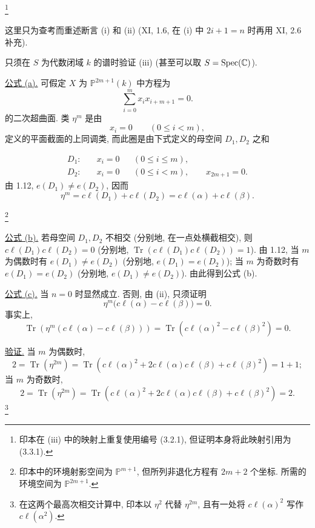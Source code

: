 \footnote{印本在 (iii) 中的映射上重复使用编号 (3.2.1), 但证明本身将此映射引用为 (3.3.1).}

这里只为查考而重述断言 (i) 和 (ii) (XI, 1.6, 在 (i) 中 $2i+1=n$ 时再用 XI, 2.6 补充).

只须在 $S$ 为代数闭域 $k$ 的谱时验证 (iii) (甚至可以取 $S=\operatorname{Spec}(\mathbb C)$).

\underline{公式 (a).} 可假定 $X$ 为 $\mathbb P^{2m+1}(k)$ 中方程为
\begin{equation*}
\sum_{i=0}^{m}x_i x_{i+m+1}=0.
\end{equation*}
的二次超曲面. 类 $\eta^m$ 是由
\begin{equation*}
x_i=0\qquad(0\leq i<m),
\end{equation*}
定义的平面截面的上同调类, 而此圈是由下式定义的母空间 $D_1,D_2$ 之和


\begin{align*}
D_1:&\quad x_i=0 &&(0\leq i\leq m),\\
D_2:&\quad x_i=0 &&(0\leq i<m),\qquad x_{2m+1}=0.
\end{align*}
由 1.12, $e(D_1)\neq e(D_2)$, 因而
\begin{equation*}
\eta^m=c\ell(D_1)+c\ell(D_2)
=c\ell(\alpha)+c\ell(\beta).
\end{equation*}

\footnote{印本中的环境射影空间为 $\mathbb P^{m+1}$, 但所列非退化方程有 $2m+2$ 个坐标. 所需的环境空间为 $\mathbb P^{2m+1}$.}

\underline{公式 (b).} 若母空间 $D_1,D_2$ 不相交 (分别地, 在一点处横截相交), 则 $c\ell(D_1)c\ell(D_2)=0$ (分别地, $\operatorname{Tr}(c\ell(D_1)c\ell(D_2))=1$). 由 1.12, 当 $m$ 为偶数时有 $e(D_1)\neq e(D_2)$ (分别地, $e(D_1)=e(D_2)$); 当 $m$ 为奇数时有 $e(D_1)=e(D_2)$ (分别地, $e(D_1)\neq e(D_2)$). 由此得到公式 (b).

\underline{公式 (c).} 当 $n=0$ 时显然成立. 否则, 由 (ii), 只须证明
\begin{equation*}
\eta^m\bigl(c\ell(\alpha)-c\ell(\beta)\bigr)=0.
\end{equation*}
事实上,
\begin{equation*}
\operatorname{Tr}\!\left(
\eta^m(c\ell(\alpha)-c\ell(\beta))\right)
=\operatorname{Tr}\!\left(c\ell(\alpha)^2-c\ell(\beta)^2\right)=0.
\end{equation*}

\underline{验证.} 当 $m$ 为偶数时,
\begin{equation*}
2=\operatorname{Tr}(\eta^{2m})
=\operatorname{Tr}\!\left(c\ell(\alpha)^2
+2c\ell(\alpha)c\ell(\beta)+c\ell(\beta)^2\right)=1+1;
\end{equation*}
当 $m$ 为奇数时,
\begin{equation*}
2=\operatorname{Tr}(\eta^{2m})
=\operatorname{Tr}\!\left(c\ell(\alpha)^2
+2c\ell(\alpha)c\ell(\beta)+c\ell(\beta)^2\right)=2.
\end{equation*}
\footnote{在这两个最高次相交计算中, 印本以 $\eta^2$ 代替 $\eta^{2m}$, 且有一处将 $c\ell(\alpha)^2$ 写作 $c\ell(\alpha^2)$.}

